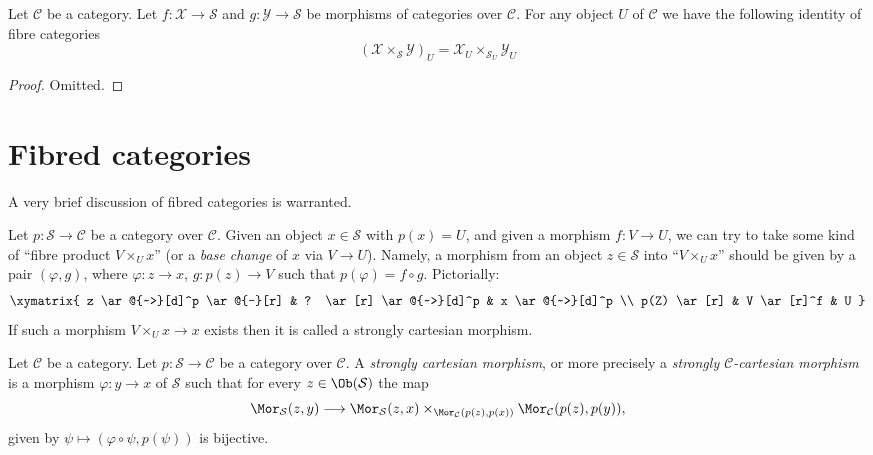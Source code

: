 \begin{lemma}
\label{lemma-fibre-2-fibre-product-categories-over-C}
Let $\mathcal{C}$ be a category.
Let $f : \mathcal{X} \to \mathcal{S}$ and
$g : \mathcal{Y} \to \mathcal{S}$ be morphisms of categories over
$\mathcal{C}$. For any object $U$ of $\mathcal{C}$ we have
the following identity of
fibre categories
$$
\left(\mathcal{X} \times_\mathcal{S}\mathcal{Y}\right)_U
=
\mathcal{X}_U \times_{\mathcal{S}_U} \mathcal{Y}_U
$$
\end{lemma}

\begin{proof}
Omitted.
\end{proof}







\section{Fibred categories}
\label{section-fibred-categories}

\noindent
A very brief discussion of fibred categories is warranted.

\medskip\noindent
Let $p : \mathcal{S} \to \mathcal{C}$ be a category over $\mathcal{C}$.
Given an object $x \in \mathcal{S}$ with $p(x) = U$, and given a morphism
$f : V \to U$, we can try to take some kind of ``fibre product
$V \times_U x$'' (or a {\it base change} of $x$ via $V \to U$).
Namely, a morphism from an object $z \in \mathcal{S}$
into ``$V \times_U x$'' should be given by a pair
$(\varphi, g)$, where
$\varphi : z \to x$, $g : p(z) \to V$ such that
$p(\varphi) = f \circ g$. Pictorially:
$$
\xymatrix{
z \ar@{~>}[d]^p \ar@{-}[r] &
? \ar[r] \ar@{~>}[d]^p &
x \ar@{~>}[d]^p \\
p(Z) \ar[r] & V \ar[r]^f & U
}
$$
If such a morphism $V \times_U x \to x$ exists then it is called
a strongly cartesian morphism.

\begin{definition}
\label{definition-cartesian-over-C}
Let $\mathcal{C}$ be a category.
Let $p : \mathcal{S} \to \mathcal{C}$ be a category over $\mathcal{C}$.
A {\it strongly cartesian morphism}, or more precisely a
{\it strongly $\mathcal{C}$-cartesian morphism} is a
morphism $\varphi : y \to x$ of $\mathcal{S}$ such that
for every $z \in \Ob(\mathcal{S})$ the map
$$
\Mor_\mathcal{S}(z, y)
\longrightarrow
\Mor_\mathcal{S}(z, x)
\times_{\Mor_\mathcal{C}(p(z), p(x))}
\Mor_\mathcal{C}(p(z), p(y)),
$$
given by $\psi \longmapsto (\varphi \circ \psi, p(\psi))$
is bijective.
\end{definition}

